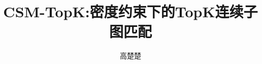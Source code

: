 \documentclass[doctor]{hnuthesis}
\title{CSM-TopK:密度约束下的TopK连续子图匹配}
\author{高楚楚}
\begin{document}
\maketitle


\tableofcontents
\begingroup
    \renewcommand*{\addvspace}[1]{}
        \listoffigures
        \newpage

        \listoftables
        \newpage
\endgroup

\mainmatter








\appendix



\backmatter

\end{document}
